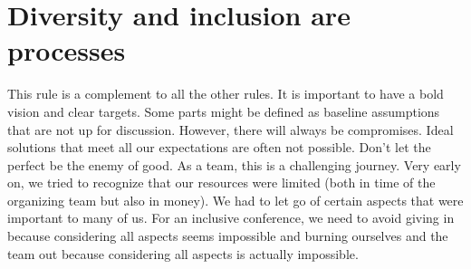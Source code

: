 \documentclass[10pt,letterpaper]{article}
\begin{document}
\section{Diversity and inclusion are processes}
\label{rule_process}


This rule is a complement to all the other rules. It is important to have a bold vision and clear targets. Some parts might be defined as baseline assumptions that are not up for discussion. However, there will always be compromises. Ideal solutions that meet all our expectations are often not possible. Don't let the perfect be the enemy of good. As a team, this is a challenging journey. Very early on, we tried to recognize that our resources were limited (both in time of the organizing team but also in money). We had to let go of certain aspects that were important to many of us. For an inclusive conference, we need to avoid giving in because considering all aspects seems impossible and burning ourselves and the team out because considering all aspects is actually impossible.
\end{document}
